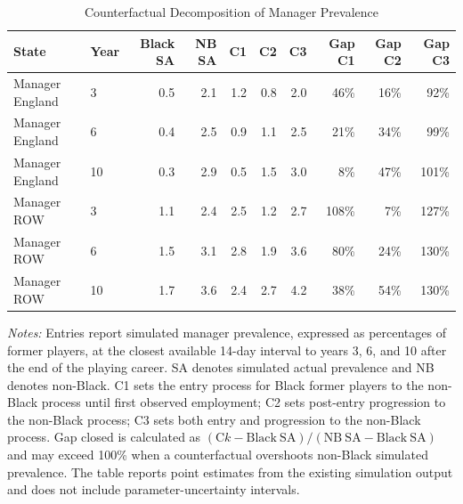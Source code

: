 \begin{table}[!h]
\centering
\caption{Counterfactual Decomposition of Manager Prevalence}
\label{tab:headline_decomposition}
\footnotesize
\begin{threeparttable}
\begin{tabular}{llrrrrrrrr}
\toprule
State & Year & Black SA & NB SA & C1 & C2 & C3 & Gap C1 & Gap C2 & Gap C3 \\ 
\midrule
Manager England & 3 & 0.5 & 2.1 & 1.2 & 0.8 & 2.0 & 46\% & 16\% & 92\% \\ 
Manager England & 6 & 0.4 & 2.5 & 0.9 & 1.1 & 2.5 & 21\% & 34\% & 99\% \\ 
Manager England & 10 & 0.3 & 2.9 & 0.5 & 1.5 & 3.0 & 8\% & 47\% & 101\% \\ 
Manager ROW & 3 & 1.1 & 2.4 & 2.5 & 1.2 & 2.7 & 108\% & 7\% & 127\% \\ 
Manager ROW & 6 & 1.5 & 3.1 & 2.8 & 1.9 & 3.6 & 80\% & 24\% & 130\% \\ 
Manager ROW & 10 & 1.7 & 3.6 & 2.4 & 2.7 & 4.2 & 38\% & 54\% & 130\% \\ 
\bottomrule
\end{tabular}
\begin{tablenotes}[flushleft]
\item[] \scriptsize \textit{Notes:} Entries report simulated manager prevalence, expressed as percentages of former players, at the closest available 14-day interval to years 3, 6, and 10 after the end of the playing career. SA denotes simulated actual prevalence and NB denotes non-Black. C1 sets the entry process for Black former players to the non-Black process until first observed employment; C2 sets post-entry progression to the non-Black process; C3 sets both entry and progression to the non-Black process. Gap closed is calculated as $(\mathrm{C}k - \mathrm{Black\ SA})/(\mathrm{NB\ SA} - \mathrm{Black\ SA})$ and may exceed 100\% when a counterfactual overshoots non-Black simulated prevalence. The table reports point estimates from the existing simulation output and does not include parameter-uncertainty intervals.
\end{tablenotes}
\end{threeparttable}
\end{table}
